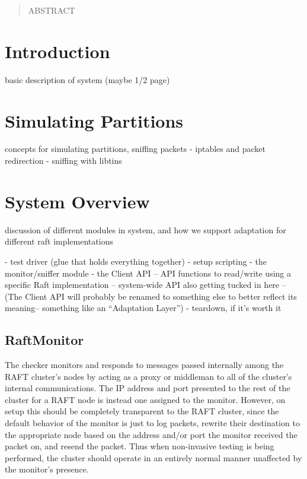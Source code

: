 \documentclass[UTF8]{article}
\begin{document}
 

\setlength\parindent{24pt}

\begin{abstract}
	
ABSTRACT

\end{abstract} 

\section{Introduction}

basic description of system (maybe 1/2 page)

\section{Simulating Partitions}

concepts for simulating partitions, sniffing packets
- iptables and packet redirection
- sniffing with libtins

\section{System Overview}

discussion of different modules in system, and how we support adaptation for different raft implementations

- test driver (glue that holds everything together)
- setup scripting
- the monitor/sniffer module
- the Client API
-- API functions to read/write using a specific Raft implementation
-- system-wide API also getting tucked in here
-- (The Client API will probably be renamed to something else to better reflect its meaning-- something like an ``Adaptation Layer'')
- teardown, if it's worth it

\subsection{RaftMonitor}

The checker monitors and responds to messages passed internally among the RAFT cluster's nodes by acting as a proxy or middleman to all of the cluster's internal communications. The IP address and port presented to the rest of the cluster for a RAFT node is instead one assigned to the monitor. However, on setup this should be completely transparent to the RAFT cluster, since the default behavior of the monitor is just to log packets, rewrite their destination to the appropriate node based on the address and/or port the monitor received the packet on, and resend the packet. Thus when non-invasive testing is being performed, the cluster should operate in an entirely normal manner unaffected by the monitor's presence.
\end{document}
